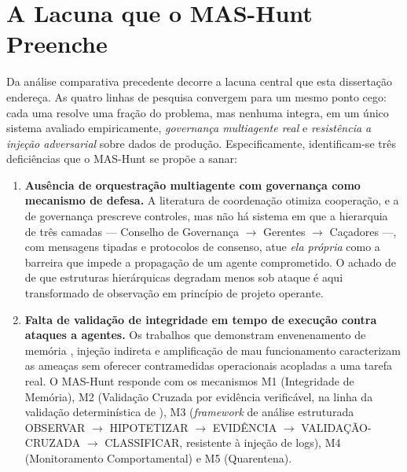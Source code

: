 \section{A Lacuna que o MAS-Hunt Preenche}
\label{sec:rel-lacunas}

Da análise comparativa precedente decorre a lacuna central que esta dissertação
endereça. As quatro linhas de pesquisa convergem para um mesmo ponto cego: cada
uma resolve uma fração do problema, mas nenhuma integra, em um único sistema
avaliado empiricamente, \textit{governança multiagente real} e \textit{resistência
a injeção adversarial} sobre dados de produção. Especificamente, identificam-se
três deficiências que o MAS-Hunt se propõe a sanar:

\begin{enumerate}
    \item \textbf{Ausência de orquestração multiagente com governança como mecanismo
    de defesa.} A literatura de coordenação \cite{liu2023llm,agashe2023llmcoordination,qiu2024collaborativeintelligencepropagatingintentions}
    otimiza cooperação, e a de governança \cite{isaca2025leveraging,mcintosh2024cobit}
    prescreve controles, mas não há sistema em que a hierarquia de três camadas
    --- Conselho de Governança $\rightarrow$ Gerentes $\rightarrow$ Caçadores ---,
    com mensagens tipadas e protocolos de consenso, atue \textit{ela própria} como
    a barreira que impede a propagação de um agente comprometido. O achado de
     de que estruturas hierárquicas degradam menos
    sob ataque é aqui transformado de observação em princípio de projeto operante.

    \item \textbf{Falta de validação de integridade em tempo de execução contra
    ataques a agentes.} Os trabalhos que demonstram envenenamento de memória
    \cite{NEURIPS2024_eb113910}, injeção indireta \cite{zhan2024injecagent} e
    amplificação de mau funcionamento \cite{zhang2024breaking} caracterizam as
    ameaças sem oferecer contramedidas operacionais acopladas a uma tarefa real. O
    MAS-Hunt responde com os mecanismos M1 (Integridade de Memória), M2 (Validação
    Cruzada por evidência verificável, na linha da validação determinística de
    ), M3 (\textit{framework} de análise estruturada
    OBSERVAR $\rightarrow$ HIPOTETIZAR $\rightarrow$ EVIDÊNCIA $\rightarrow$
    VALIDAÇÃO-CRUZADA $\rightarrow$ CLASSIFICAR, resistente à injeção de logs),
    M4 (Monitoramento Comportamental) e M5 (Quarentena).


\end{enumerate}
